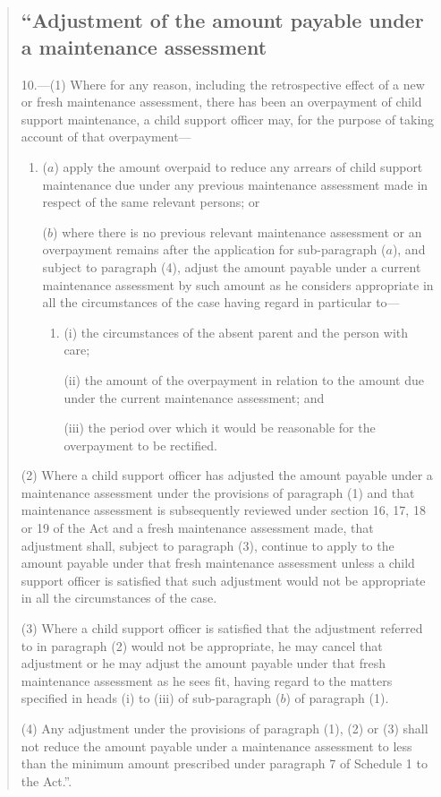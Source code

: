\documentclass[12pt,a4paper]{article}
\begin{document}
\begin{quotation}
\subsection*{“Adjustment of the amount payable under a maintenance assessment}

10.—(1) Where for any reason, including the retrospective effect of a new or fresh maintenance assessment, there has been an overpayment of child support maintenance, a child support officer may, for the purpose of taking account of that overpayment—
\begin{enumerate}\item[]
($a$) apply the amount overpaid to reduce any arrears of child support maintenance due under any previous maintenance assessment made in respect of the same relevant persons; or

($b$) where there is no previous relevant maintenance assessment or an overpayment remains after the application for sub-paragraph ($a$), and subject to paragraph (4), adjust the amount payable under a current maintenance assessment by such amount as he considers appropriate in all the circumstances of the case having regard in particular to—
\begin{enumerate}\item[]
(i) the circumstances of the absent parent and the person with care;

\begin{sloppypar}
(ii) the amount of the overpayment in relation to the amount due under the current maintenance assessment; and
\end{sloppypar}

(iii) the period over which it would be reasonable for the overpayment to be rectified.
\end{enumerate}
\end{enumerate}

\begin{sloppypar}
(2) Where a child support officer has adjusted the amount payable under a maintenance assessment under the provisions of paragraph (1) and that maintenance assessment is subsequently reviewed under section 16, 17, 18 or 19 of the Act and a fresh maintenance assessment made, that adjustment shall, subject to paragraph (3), continue to apply to the amount payable under that fresh maintenance assessment unless a child support officer is satisfied that such adjustment would not be appropriate in all the circumstances of the case.
\end{sloppypar}

(3) Where a child support officer is satisfied that the adjustment referred to in paragraph (2) would not be appropriate, he may cancel that adjustment or he may adjust the amount payable under that fresh maintenance assessment as he sees fit, having regard to the matters specified in heads (i) to (iii) of sub-paragraph ($b$) of paragraph (1).

(4) Any adjustment under the provisions of paragraph (1), (2) or (3) shall not reduce the amount payable under a maintenance assessment to less than the minimum amount prescribed under paragraph 7 of Schedule 1 to the Act.”.
\end{quotation}
\end{document}

